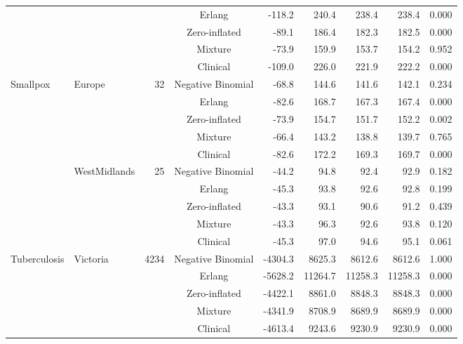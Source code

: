 \begin{table}[ht]
\begin{tabular}{llrcrrrrr}
   &  &  & Erlang & -118.2 & 240.4 & 238.4 & 238.4 & 0.000 \\ 
   &  &  & Zero-inflated & -89.1 & 186.4 & 182.3 & 182.5 & 0.000 \\ 
   &  &  & Mixture & -73.9 & 159.9 & 153.7 & 154.2 & 0.952 \\ 
   &  &  & Clinical & -109.0 & 226.0 & 221.9 & 222.2 & 0.000 \\ 
  Smallpox & Europe & 32 & Negative Binomial & -68.8 & 144.6 & 141.6 & 142.1 & 0.234 \\ 
   &  &  & Erlang & -82.6 & 168.7 & 167.3 & 167.4 & 0.000 \\ 
   &  &  & Zero-inflated & -73.9 & 154.7 & 151.7 & 152.2 & 0.002 \\ 
   &  &  & Mixture & -66.4 & 143.2 & 138.8 & 139.7 & 0.765 \\ 
   &  &  & Clinical & -82.6 & 172.2 & 169.3 & 169.7 & 0.000 \\ 
   & WestMidlands & 25 & Negative Binomial & -44.2 & 94.8 & 92.4 & 92.9 & 0.182 \\ 
   &  &  & Erlang & -45.3 & 93.8 & 92.6 & 92.8 & 0.199 \\ 
   &  &  & Zero-inflated & -43.3 & 93.1 & 90.6 & 91.2 & 0.439 \\ 
   &  &  & Mixture & -43.3 & 96.3 & 92.6 & 93.8 & 0.120 \\ 
   &  &  & Clinical & -45.3 & 97.0 & 94.6 & 95.1 & 0.061 \\ 
  Tuberculosis & Victoria & 4234 & Negative Binomial & -4304.3 & 8625.3 & 8612.6 & 8612.6 & 1.000 \\ 
   &  &  & Erlang & -5628.2 & 11264.7 & 11258.3 & 11258.3 & 0.000 \\ 
   &  &  & Zero-inflated & -4422.1 & 8861.0 & 8848.3 & 8848.3 & 0.000 \\ 
   &  &  & Mixture & -4341.9 & 8708.9 & 8689.9 & 8689.9 & 0.000 \\ 
   &  &  & Clinical & -4613.4 & 9243.6 & 9230.9 & 9230.9 & 0.000 \\ 
   \hline
\end{tabular}
\end{table}
